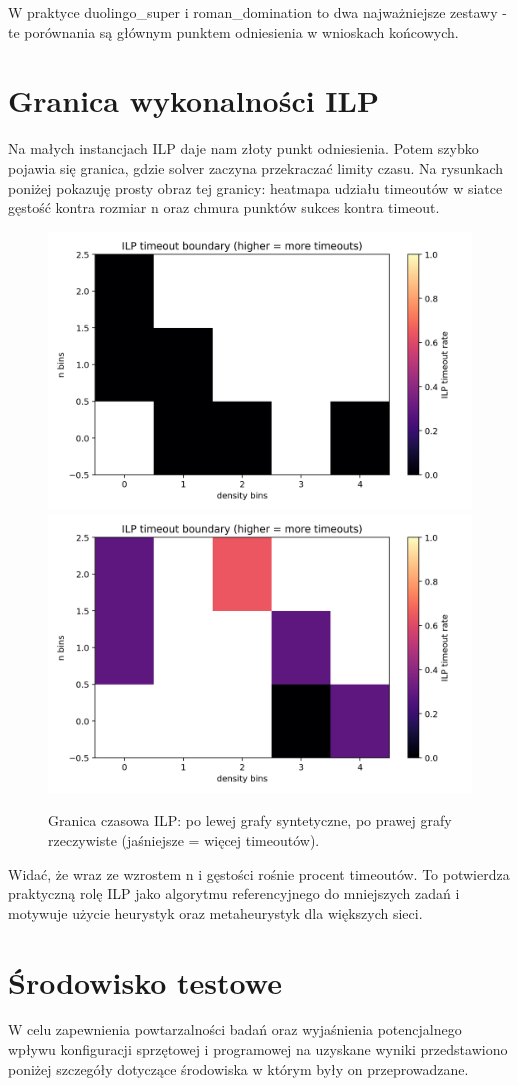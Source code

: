 W praktyce duolingo\_super i roman\_domination to dwa najważniejsze zestawy - te porównania są głównym punktem odniesienia w wnioskach końcowych.

\section{Granica wykonalności ILP}
Na małych instancjach ILP daje nam złoty punkt odniesienia. Potem szybko pojawia się granica, gdzie solver zaczyna przekraczać limity czasu. Na rysunkach poniżej pokazuję prosty obraz tej granicy: heatmapa udziału timeoutów w siatce gęstość kontra rozmiar n oraz chmura punktów sukces kontra timeout.

\begin{figure}[h]
  \centering
  \includegraphics[width=0.48\linewidth]{assets/figures/ba_ilp_timeout_boundary.png}
  \includegraphics[width=0.48\linewidth]{assets/figures/br_ilp_timeout_boundary.png}
  \caption{Granica czasowa ILP: po lewej grafy syntetyczne, po prawej grafy rzeczywiste (jaśniejsze = więcej timeoutów).}
  \label{fig:ilp_timeout}
\end{figure}

Widać, że wraz ze wzrostem n i gęstości rośnie procent timeoutów. To potwierdza praktyczną rolę ILP jako algorytmu referencyjnego do mniejszych zadań i motywuje użycie heurystyk oraz metaheurystyk dla większych sieci.


\section{Środowisko testowe}

W celu zapewnienia powtarzalności badań oraz wyjaśnienia potencjalnego wpływu konfiguracji sprzętowej i programowej na uzyskane wyniki przedstawiono poniżej szczegóły dotyczące środowiska w którym były on przeprowadzane.

